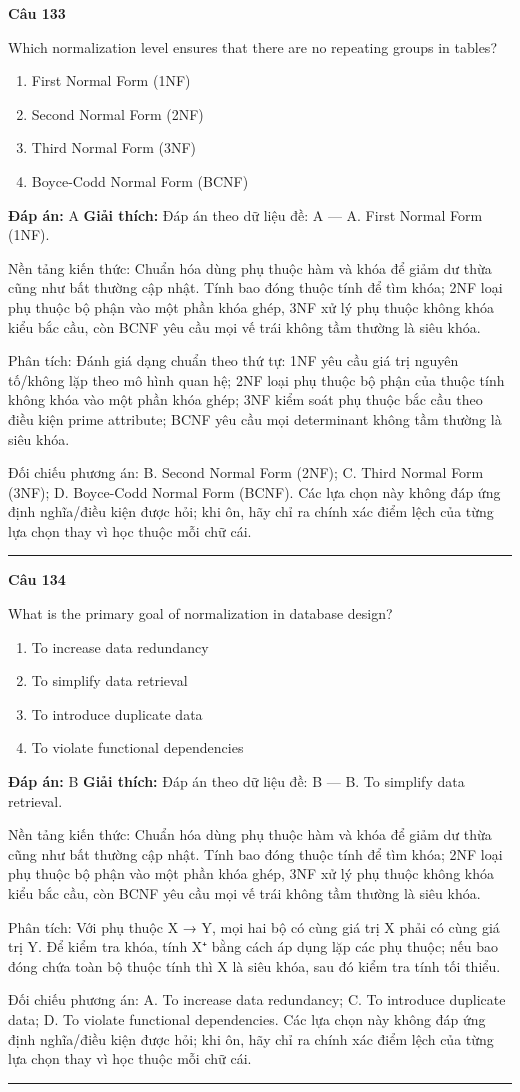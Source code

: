 \documentclass[11pt,a4paper]{article}
\newenvironment{question}[1]{%
  \par\vspace{1em}\noindent\textbf{\large Câu #1}\par\vspace{0.4em}
}{%
  \par\vspace{1em}\hrule\vspace{0.6em}
}
\newenvironment{choices}{%
  \begin{enumerate}[label=\textbf{\Alph*.},leftmargin=2.2em,itemsep=2pt,topsep=3pt]
}{%
  \end{enumerate}
}
\newcommand{\choice}{\item}
\begin{document}
\begin{question}{133}
Which normalization level ensures that there are no repeating groups in tables?
\begin{choices}
\choice First Normal Form (1NF)
\choice Second Normal Form (2NF)
\choice Third Normal Form (3NF)
\choice Boyce-Codd Normal Form (BCNF)
\end{choices}
\textbf{Đáp án:} A
\textbf{Giải thích:} Đáp án theo dữ liệu đề: A — A. First Normal Form (1NF).

Nền tảng kiến thức: Chuẩn hóa dùng phụ thuộc hàm và khóa để giảm dư thừa cũng như bất thường cập nhật. Tính bao đóng thuộc tính để tìm khóa; 2NF loại phụ thuộc bộ phận vào một phần khóa ghép, 3NF xử lý phụ thuộc không khóa kiểu bắc cầu, còn BCNF yêu cầu mọi vế trái không tầm thường là siêu khóa.

Phân tích: Đánh giá dạng chuẩn theo thứ tự: 1NF yêu cầu giá trị nguyên tố/không lặp theo mô hình quan hệ; 2NF loại phụ thuộc bộ phận của thuộc tính không khóa vào một phần khóa ghép; 3NF kiểm soát phụ thuộc bắc cầu theo điều kiện prime attribute; BCNF yêu cầu mọi determinant không tầm thường là siêu khóa.

Đối chiếu phương án: B. Second Normal Form (2NF); C. Third Normal Form (3NF); D. Boyce-Codd Normal Form (BCNF). Các lựa chọn này không đáp ứng định nghĩa/điều kiện được hỏi; khi ôn, hãy chỉ ra chính xác điểm lệch của từng lựa chọn thay vì học thuộc mỗi chữ cái.
\end{question}

\begin{question}{134}
What is the primary goal of normalization in database design?
\begin{choices}
\choice To increase data redundancy
\choice To simplify data retrieval
\choice To introduce duplicate data
\choice To violate functional dependencies
\end{choices}
\textbf{Đáp án:} B
\textbf{Giải thích:} Đáp án theo dữ liệu đề: B — B. To simplify data retrieval.

Nền tảng kiến thức: Chuẩn hóa dùng phụ thuộc hàm và khóa để giảm dư thừa cũng như bất thường cập nhật. Tính bao đóng thuộc tính để tìm khóa; 2NF loại phụ thuộc bộ phận vào một phần khóa ghép, 3NF xử lý phụ thuộc không khóa kiểu bắc cầu, còn BCNF yêu cầu mọi vế trái không tầm thường là siêu khóa.

Phân tích: Với phụ thuộc X → Y, mọi hai bộ có cùng giá trị X phải có cùng giá trị Y. Để kiểm tra khóa, tính X⁺ bằng cách áp dụng lặp các phụ thuộc; nếu bao đóng chứa toàn bộ thuộc tính thì X là siêu khóa, sau đó kiểm tra tính tối thiểu.

Đối chiếu phương án: A. To increase data redundancy; C. To introduce duplicate data; D. To violate functional dependencies. Các lựa chọn này không đáp ứng định nghĩa/điều kiện được hỏi; khi ôn, hãy chỉ ra chính xác điểm lệch của từng lựa chọn thay vì học thuộc mỗi chữ cái.
\end{question}
\end{document}
